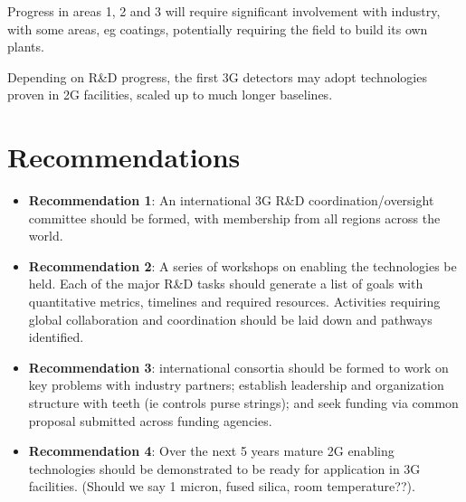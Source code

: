 Progress in areas 1, 2 and 3 will require significant involvement with industry, with some areas, eg coatings,  potentially requiring the field to build its own plants.

Depending on R\&D progress, the first 3G detectors may adopt technologies proven in 2G facilities, scaled up to much longer baselines. 

\section*{Recommendations}
 
\begin{itemize}
\item \textbf{Recommendation 1}:  An international 3G R\&D coordination/oversight committee should be formed, with membership from all regions across the world.
\item \textbf{Recommendation 2}:  A series of workshops on enabling the technologies be held.  Each of the major R\&D tasks should generate a list of  goals with quantitative metrics,  timelines and required resources.   Activities requiring global collaboration and coordination should be laid down and pathways identified.
\item \textbf{Recommendation 3}:  international consortia should be formed to work on key problems with industry partners; establish leadership and organization structure with teeth (ie controls purse strings); and seek funding via common proposal submitted across funding agencies.
\item \textbf{Recommendation 4}: Over the next 5 years mature 2G enabling technologies should be demonstrated to be ready for application in 3G facilities. (Should we say  1 micron, fused silica, room temperature??).
\end{itemize}


